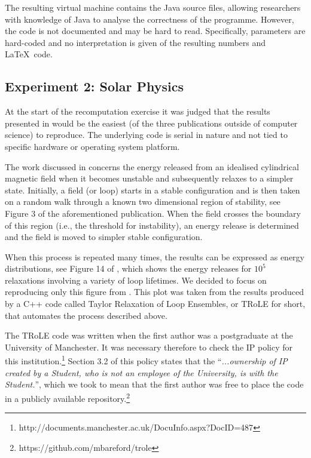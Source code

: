 The resulting virtual machine contains the Java source files, allowing researchers with knowledge of Java to analyse the correctness of the programme. However, the code is not documented and may be hard to read. Specifically, parameters are hard-coded and no interpretation is given of the resulting numbers and \LaTeX\ code.

\subsection*{Experiment 2: Solar Physics}

At the start of the recomputation exercise it was judged that the results presented in \cite{bareford2010nanoflare} would be the easiest (of the three publications outside of computer science) to reproduce. The underlying code is serial in nature and not tied to specific hardware or operating system platform. 

The work discussed in \cite{bareford2010nanoflare} concerns the energy released from an idealised cylindrical magnetic field when it becomes unstable and subsequently relaxes to a simpler state. Initially, a field (or loop) starts in a stable configuration and is then taken on a random walk through a known two dimensional region of stability, see Figure 3 of the aforementioned publication. When the field crosses the boundary of this region (i.e., the threshold for instability), an energy release is determined and the field is moved to simpler stable configuration. 

When this process is repeated many times, the results can be expressed as energy distributions, see Figure 14 of \cite{bareford2010nanoflare}, which shows the energy releases for $10^5$ relaxations involving a variety of loop lifetimes. We decided to focus on reproducing only this figure from \cite{bareford2010nanoflare}. This plot was taken from the results produced by a C++ code called Taylor Relaxation of Loop Ensembles, or TRoLE for short, that automates the process described above.

The TRoLE code was written when the first author was a postgraduate at the University of Manchester. It was necessary therefore to check the IP policy for this institution.\footnote{http://documents.manchester.ac.uk/DocuInfo.aspx?DocID=487} Section 3.2 of this policy states that the ``\emph{...ownership of IP created by a Student, who is not an employee of the University, is with the Student.}'', which we took to mean that the first author was free to place the code in a publicly available repository.\footnote{https://github.com/mbareford/trole}

